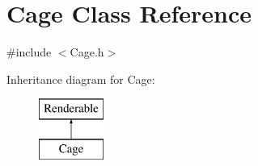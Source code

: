 \hypertarget{classCage}{\section{Cage Class Reference}
\label{classCage}
}


{\ttfamily \#include $<$Cage.\-h$>$}

Inheritance diagram for Cage\-:\begin{figure}[H]
\begin{center}
\leavevmode
\includegraphics[height=2.000000cm]{classCage}
\end{center}
\end{figure}
